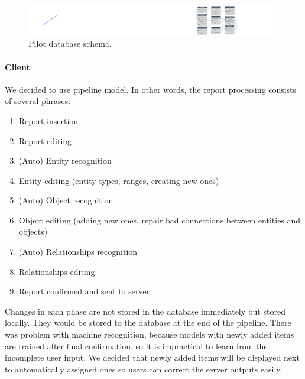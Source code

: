 \begin{figure}[!htb]
        \centering
        \includegraphics[width=\textwidth]{Images/db-pilot}
        \caption{Pilot database schema.}
        \label{fig:dbpilot}
\end{figure}

\paragraph{Client}
We decided to use pipeline model. In other words, the report processing consists
of several phrases:

\begin{enumerate}
\item Report insertion
\item Report editing
\item (Auto) Entity recognition
\item Entity editing (entity types, ranges, creating new ones)
\item (Auto) Object recognition
\item Object editing (adding new ones, repair bad connections between entities and objects)
\item (Auto) Relationships recognition
\item Relationships editing
\item Report confirmed and sent to server
\end{enumerate}

Changes in each phase are not stored in the database immediately but stored
locally. They would be stored to the database at the end of the pipeline. There
was problem with machine recognition, because models with newly added items are
trained after final confirmation, so it is impractical to learn from the
incomplete user input. We decided that newly added items will be displayed next
to automatically assigned ones so users can correct the server outputs easily.
 
